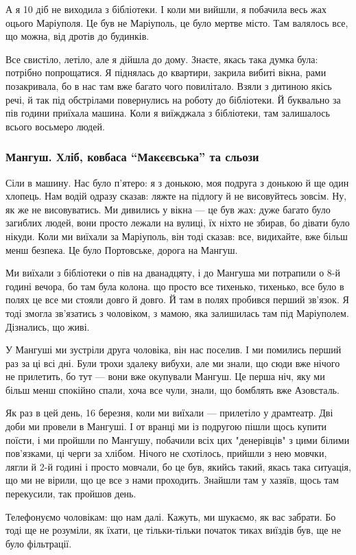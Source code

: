 \begin{qqquote}
А я 10 діб не виходила з бібліотеки. І коли ми вийшли, я побачила весь жах
оцього Маріуполя. Це був не Маріуполь, це було мертве місто. Там валялось все,
що можна, від дротів до будинків.	
\end{qqquote}


Все свистіло, летіло, але я дійшла до дому. Знаєте, якась така думка була:
потрібно попрощатися. Я піднялась до квартири, закрила вибиті вікна, рами
позакривала, бо в нас там вже багато чого повилітало. Взяли з дитиною якісь
речі, й так під обстрілами повернулись на роботу до бібліотеки. Й буквально за
пів години приїхала машина. Коли я виїжджала з бібліотеки, там залишалось
всього восьмеро людей.

\subsubsection{Мангуш. Хліб, ковбаса \enquote{Макєєвська} та сльози}

Сіли в машину. Нас було п'ятеро: я з донькою, моя подруга з донькою й ще один
хлопець. Нам водій одразу сказав: ляжте на підлогу й не висовуйтесь зовсім. Ну,
як же не висовуватись. Ми дивились у вікна — це був жах: дуже багато було
загиблих людей, вони просто лежали на вулиці, їх ніхто не збирав, бо дівати
було нікуди. Коли ми виїхали за Маріуполь, він тоді сказав: все, видихайте, вже
більш менш безпека. Це було Портовське, дорога на Мангуш.

Ми виїхали з бібліотеки о пів на дванадцяту, і до Мангуша ми потрапили о 8-й
годині вечора, бо там була колона. що просто все тихенько, тихенько, все було в
полях це все ми стояли довго й довго. Й там в полях пробився перший зв'язок. Я
тоді змогла зв'язатись з чоловіком, з мамою, яка залишилась там під Маріуполем.
Дізнались, що живі.


У Мангуші ми зустріли друга чоловіка, він нас поселив. І ми помились перший раз
за ці всі дні. Були трохи здалеку вибухи, але ми знали, що сюди вже нічого не
прилетить, бо тут — вони вже окупували Мангуш. Це перша ніч, яку ми більш менш
спокійно спали, хоча все чули, знали, що бомблять вже Азовсталь.

Як раз в цей день, 16 березня, коли ми виїхали — прилетіло у драмтеатр. Дві
доби ми провели в Мангуші. І от вранці ми із подругою пішли щось купити поїсти,
і ми пройшли по Мангушу, побачили всіх цих "денерівців" з цими білими
пов’язками, ці черги за хлібом. Нічого не схотілось, прийшли з нею мовчки,
лягли й 2-й годині і просто мовчали, бо це був, якийсь такий, якась така
ситуація, що ми не вірили, що це все з нами проходить. Знайшли там у хазяїв,
щось там перекусили, так пройшов день.

Телефонуємо чоловікам: що нам далі. Кажуть, ми шукаємо, як вас забрати. Бо тоді
ще не розуміли, як їхати, це тільки-тільки початок тиках виїздів був, ще не
було фільтрації.
